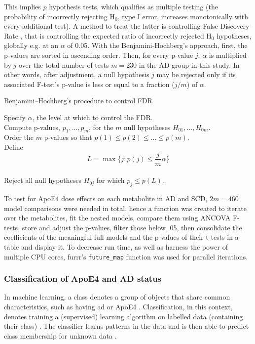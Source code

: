 \documentclass{amsart}
\begin{document}
This implies $p$ hypothesis tests, which qualifies as multiple testing (the probability of incorrectly rejecting H$_0$, type I error, increases monotonically with every additional test). A method to treat the latter is controlling False Discovery Rate \cite{Benjamini1995ControllingTesting}, that is controlling the expected ratio of incorrectly rejected H$_0$ hypotheses, globally e.g. at an $\alpha$ of 0.05. With the Benjamini-Hochberg's approach, first, the p-values are sorted in ascending order. Then, for every p-value $j$, $\alpha$ is multiplied by $j$ over the total number of tests \cite{Benjamini1995ControllingTesting} $m=230$ in the AD group in this study. In other words, after adjustment, a null hypothesis $j$ may be rejected only if its associated F-test's p-value is less or equal to a fraction ($j/m$) of $\alpha$.

\begin{algorithm}
\caption{Benjamini–Hochberg's procedure to control FDR}\label{alg:fdr}
Specify $\alpha$, the level at which to control the FDR.\\
Compute p-values, $p_1, ... , p_m$, for the $m$ null hypotheses $H_{01},...,H_{0m}$. \\
Order the $m$ p-values so that $p(1) \leq p(2) \leq ... \leq p(m)$.\\
Define
\[L = \max\{j : p(j) \leq \frac{j}{m}\alpha\}\] \\
Reject all null hypotheses $H_{0j}$ for which $p_j \leq p(L)$.
\end{algorithm}

To test for ApoE4 dose effects on each metabolite in AD and SCD, $2m=460$ model comparisons were needed in total, hence a function was created to iterate over the metabolites, fit the nested models, compare them using ANCOVA F-tests, store and adjust the p-values, filter those below .05, then consolidate the coefficients of the meaningful full models and the p-values of their t-tests in a table and display it. To decrease run time, as well as harness the power of multiple CPU cores, \textsf{furrr}'s \texttt{future\_map} function was used for parallel iterations.

\subsubsection{Classification of ApoE4 and AD status}\label{rq2}
In machine learning, a class denotes a group of objects that share common characteristics, such as having \acrshort{ad} or ApoE4 \cite*{Drummond2010}. Classification, in this context, denotes training a (supervised) learning algorithm on labelled data (containing their class) \cite*{Drummond2010}. The classifier learns patterns in the data and is then able to predict class membership for unknown data \cite*{Drummond2010}.
\end{document}
